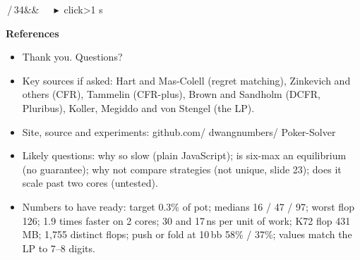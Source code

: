 \documentclass{article}
\newcommand{\slide}[4]{\clearpage
  \noindent\colorbox{bar}{\parbox{\dimexpr\linewidth-2\fboxsep}{\color{white}\fontsize{13}{15}\selectfont
  \textbf{\fontsize{21}{23}\selectfont #1}\,/\,34\hfill #3\ifx&#4&\else\ \ \ \textcolor{ck!40!white}{\ensuremath{\blacktriangleright}}\,#4 click\ifnum#4>1 s\fi\fi\\[2pt]
  \raggedright\textbf{\fontsize{15}{17.5}\selectfont #2}}}\par\vspace{5pt}
  \fontsize{15}{17.8}\selectfont\raggedright}
\newcommand{\pt}{\item[\textbullet]}
\begin{document}
\slide{34}{References}{}{}
\begin{itemize}
\pt Thank you. Questions?
\pt Key sources if asked: Hart and Mas-Colell (regret matching), Zinkevich and others (CFR), Tammelin (CFR-plus), Brown and Sandholm (DCFR, Pluribus), Koller, Megiddo and von Stengel (the LP).
\pt Site, source and experiments: github.com/ dwangnumbers/ Poker-Solver
\pt Likely questions: why so slow (plain JavaScript); is six-max an equilibrium (no guarantee); why not compare strategies (not unique, slide 23); does it scale past two cores (untested).
\pt Numbers to have ready: target 0.3\% of pot; medians 16 / 47 / 97; worst flop 126; 1.9 times faster on 2 cores; 30 and 17\,ns per unit of work; K72 flop 431\,MB; 1,755 distinct flops; push or fold at 10\,bb 58\% / 37\%; values match the LP to 7--8 digits.
\end{itemize}
\end{document}
